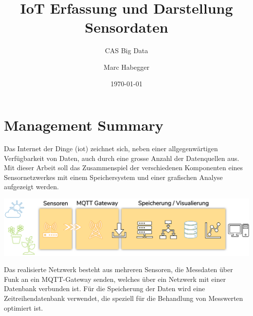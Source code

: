 \documentclass[
  12pt, %
  a4paper, %
  twoside, %
  openany, %
  numbers=noenddot, %
  BCOR=5mm, %
  parskip=half*, %
  thesis, %
]{bfhbook}
\author{Marc Habegger}
\title{IoT Erfassung und Darstellung Sensordaten}
\subtitle{CAS Big Data}
\date{\today} %
\begin{document}
\maketitle

\tableofcontents
\sloppy
\mainmatter %
\chapter*{Management Summary}
Das Internet der Dinge (\Gls{iot}) zeichnet sich, neben einer allgegenwärtigen Verfügbarkeit von Daten, auch durch eine grosse Anzahl der Datenquellen aus. Mit dieser Arbeit soll das Zusammenspiel der verschiedenen Komponenten eines Sensornetzwerkes mit einem Speichersystem und einer grafischen Analyse aufgezeigt werden.

  \begin{center}\label{overview}
    \includegraphics[width=18cm, left]{Bilder/Overview.png}
     \captionsetup{justification=centering}
  \end{center}
   
Das realisierte Netzwerk besteht aus mehreren Sensoren, die Messdaten über Funk an ein MQTT-Gateway senden, welches über ein Netzwerk mit einer Datenbank verbunden ist. Für die Speicherung der Daten wird eine Zeitreihendatenbank verwendet, die speziell für die Behandlung von Messwerten optimiert ist.
\end{document}
